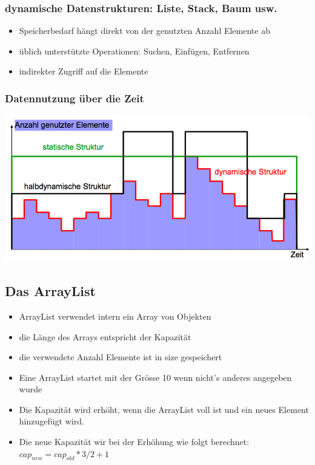 \documentclass[a4paper,10pt]{article}
\begin{document}
\subsubsection{dynamische Datenstrukturen: Liste, Stack, Baum usw.}
\begin{itemize}
	\item Speicherbedarf hängt direkt von der genutzten Anzahl Elemente ab
	\item üblich unterstützte Operationen: Suchen, Einfügen, Entfernen
	\item indirekter Zugriff auf die Elemente
\end{itemize}

\subsubsection{Datennutzung über die Zeit}
\includegraphics[width=150mm]{datennutzung_ueber_zeit.png}

\subsection{Das ArrayList}
\begin{itemize}
	\item ArrayList verwendet intern ein Array von Objekten
	\item die Länge des Arrays entspricht der Kapazität
	\item die verwendete Anzahl Elemente ist in size gespeichert
	\item Eine ArrayList startet mit der Grösse 10 wenn nicht's anderes angegeben wurde
	\item Die Kapazität wird erhöht, wenn die ArrayList voll ist und ein neues Element hinzugefügt wird.
	\item Die neue Kapazität wir bei der Erhöhung wie folgt berechnet: $cap_{new}=cap_{old} * 3 / 2 + 1$
\end{itemize}
\end{document}
